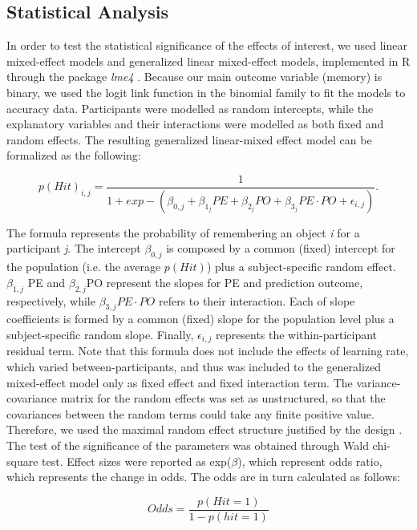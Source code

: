 \documentclass[a4paper,12pt]{article}
\begin{document}
\subsection{Statistical Analysis}
In order to test the statistical significance of the effects of interest, we used linear mixed-effect models and generalized linear mixed-effect models, implemented in R through the package \textit{lme4} \citep{bates2014fitting}. Because our main outcome variable (memory) is binary, we used the logit link function in the binomial family to fit the models to accuracy data. Participants were modelled as random intercepts, while the explanatory variables and their interactions were modelled as both fixed and random effects. The resulting generalized linear-mixed effect model can be formalized as the following:

\begin{equation}
p(Hit)_{i,j} =   \dfrac{1}{1+exp - (\beta_{0,j} +\beta_{1_j} PE +\beta_{2_j} PO + \beta_{3_j} PE \cdot PO + \epsilon_{i,j} )}.
\end{equation}

\noindent
The formula represents the probability of remembering an object \textit{i} for a participant \textit{j}. The intercept $\beta_{0,j}$ is composed by a common (fixed) intercept for the population (i.e. the average $p(Hit)$) plus a subject-specific random effect. $\beta_{1,j}$ PE and $\beta_{2, j}$PO represent the slopes for PE and prediction outcome, respectively, while  $\beta_{3, j} PE \cdot PO$  refers to their interaction. Each of slope coefficients is formed by a common (fixed) slope for the population level plus a subject-specific random slope. Finally, $\epsilon_{i,j}$ represents the within-participant residual term. Note that this formula does not include the effects of learning rate, which varied between-participants, and thus was included to the generalized mixed-effect model only as fixed effect and fixed interaction term.  
The variance-covariance matrix for the random effects was set as unstructured, so that the covariances between the random terms could take any finite positive value.  Therefore, we used the maximal random effect structure justified by the design \citep{barr2013random}. The test of the significance of the parameters was obtained through Wald chi-square test. Effect sizes were reported as exp($\beta$), which represent odds ratio, which represents the change in odds. The odds are in turn calculated as follows:

\begin{equation}
Odds =   \dfrac{p(Hit=1)}{1-p(hit=1)}
\end{equation}
\end{document}
